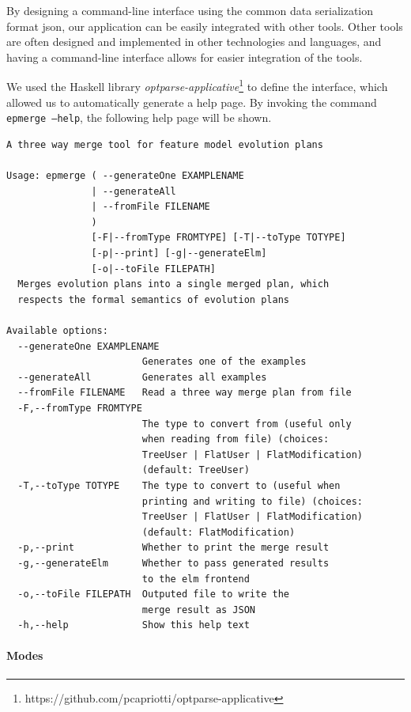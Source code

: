 \documentclass[a4paper,english]{ifimaster}
\begin{document}
By designing a command-line interface using the common data serialization format json, our application can be easily integrated with other tools. Other tools are often designed and implemented in other technologies and languages, and having a command-line interface allows for easier integration of the tools.

We used the Haskell library \textit{optparse-applicative}\footnote{https://github.com/pcapriotti/optparse-applicative} to define the interface, which allowed us to automatically generate a help page. By invoking the command \texttt{epmerge --help}, the following help page will be shown.

\begin{verbatim}
A three way merge tool for feature model evolution plans

Usage: epmerge ( --generateOne EXAMPLENAME 
               | --generateAll 
               | --fromFile FILENAME
               )
               [-F|--fromType FROMTYPE] [-T|--toType TOTYPE] 
               [-p|--print] [-g|--generateElm] 
               [-o|--toFile FILEPATH]
  Merges evolution plans into a single merged plan, which 
  respects the formal semantics of evolution plans

Available options:
  --generateOne EXAMPLENAME
                        Generates one of the examples
  --generateAll         Generates all examples
  --fromFile FILENAME   Read a three way merge plan from file
  -F,--fromType FROMTYPE   
                        The type to convert from (useful only 
                        when reading from file) (choices: 
                        TreeUser | FlatUser | FlatModification) 
                        (default: TreeUser)
  -T,--toType TOTYPE    The type to convert to (useful when 
                        printing and writing to file) (choices: 
                        TreeUser | FlatUser | FlatModification) 
                        (default: FlatModification)
  -p,--print            Whether to print the merge result
  -g,--generateElm      Whether to pass generated results 
                        to the elm frontend
  -o,--toFile FILEPATH  Outputed file to write the 
                        merge result as JSON
  -h,--help             Show this help text
\end{verbatim}

\paragraph{Modes}%
\label{par:modes}
\end{document}
